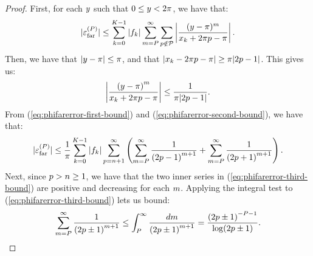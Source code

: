 \begin{proof}
  First, for each $y$ such that $0\leq{}y<2\pi{}$, we have
  that:
  \begin{align}
    \label{eq:phifarerror-first-bound}
    |{\varepsilon}^{(P)}_{\operatorname{far}}| \leq \sum_{{k{}}=0}^{K{}-1} \left|{f}_{k}\right| \sum_{m=P}^\infty \sum_{p\notin\mathcal{P}} \left|\frac{(y - \pi)^m}{{x}_{k} + 2\pi p - \pi}\right|.
  \end{align}
  Then, we have that $|y - \pi| \leq \pi$, and that
  $|{x}_{k} - 2\pi p - \pi| \geq \pi
  |2p - 1|$. This gives us:
  \begin{align}
    \label{eq:phifarerror-second-bound}
    \left|\frac{{(y - \pi)}^m}{{x}_{k} + 2\pi p - \pi}\right| \leq \frac{1}{\pi |2p - 1|}.
  \end{align}
  From (\ref{eq:phifarerror-first-bound}) and
  (\ref{eq:phifarerror-second-bound}), we have that:
  \begin{align}
    \label{eq:phifarerror-third-bound}
    |{\varepsilon}^{(P)}_{\operatorname{far}}| \leq \frac{1}{\pi} \sum_{{k}=0}^{K{}-1} |{f}_{k}| \sum_{p=n+1}^\infty \left(\sum_{m=P}^\infty \frac{1}{{(2p - 1)}^{m + 1}} + \sum_{m=P}^\infty \frac{1}{{(2p + 1)}^{m + 1}}\right).
  \end{align}
  Next, since $p > n \geq 1$, we have
  that the two inner series in (\ref{eq:phifarerror-third-bound}) are
  positive and decreasing for each $m$. Applying the
  integral test to (\ref{eq:phifarerror-third-bound}) lets us bound:
  \begin{align}
    \label{eq:phifarerror-fourth-bound}
    \sum_{m=P}^\infty \frac{1}{{(2p \pm 1)}^{m + 1}} \leq \int_P^\infty \frac{dm}{{(2p \pm 1)}^{m + 1}} = \frac{{(2p\pm 1)}^{-P-1}}{\log (2 p\pm 1)}.
  \end{align}


\end{proof}
